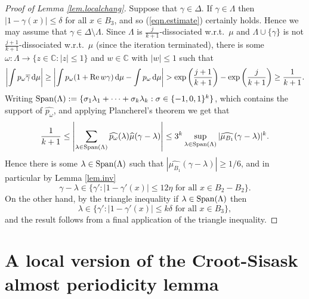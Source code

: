 \documentclass[12pt,reqno]{amsart}
\providecommand{\C}{\mathbb{C}}
\providecommand{\wh}{\widehat}
\newcommand{\dd}{\,\mathrm{d}}
\providecommand{\Span}{\mathop{\rm Span}\nolimits}
\renewcommand{\Re}{\mathop{\rm Re}\nolimits}
\numberwithin{equation}{section}
\begin{document}
\begin{proof}[Proof of Lemma \ref{lem.localchang}]
Suppose that $\gamma \in \Delta$.  If $\gamma \in \Lambda$ then $|1-\gamma(x)| \leq \delta$ for all $x \in B_3$, and so (\ref{eqn.estimate}) certainly holds. Hence we may assume that $\gamma \in \Delta \setminus \Lambda$.  Since $\Lambda$ is $\frac{j}{k+1}$-dissociated w.r.t.\ $\mu$ and $\Lambda \cup \{\gamma\}$ is not $\frac{j+1}{k+1}$-dissociated w.r.t.\ $\mu$ (since the iteration terminated), there is some $\omega:\Lambda \rightarrow \{z \in \C: |z|\leq 1\}$ and $w \in \C$ with $|w| \leq 1$ such that
\begin{equation*}
\left|\int{p_\omega \overline{\gamma} \dd\mu}\right| \geq \left|\int{p_{\omega}(1+\Re w \gamma ) \dd\mu}-\int{p_\omega \dd\mu}\right|  >  \exp\left(\frac{j+1}{k+1}\right)- \exp\left(\frac{j}{k+1}\right) \geq \frac{1}{k+1}.
\end{equation*}
Writing $\Span(\Lambda):=\{\sigma_1\lambda_1+\cdots +\sigma_k\lambda_k:\sigma \in \{-1,0,1\}^k\}$, which contains the support of $\wh{p_\omega}$, and applying Plancherel's theorem we get that
\begin{equation*}
 \frac{1}{k+1} \leq \left|\sum_{\lambda \in \Span(\Lambda)}{\wh{p_{\omega}}(\lambda)\wh{\mu}(\gamma-\lambda)}\right|\leq 3^k\sup_{\lambda \in \Span(\Lambda)}{|\wh{\mu_{B_1}}(\gamma-\lambda)|^k}.
\end{equation*}
Hence there is some $\lambda \in \Span(\Lambda)$ such that $|\wh{\mu_{B_1}}(\gamma-\lambda)| \geq 1/6$, and in particular by Lemma \ref{lem.inv}
\begin{equation*}
\gamma-\lambda \in \{\gamma': |1-\gamma'(x)| \leq 12\eta \textrm{ for all }x \in B_2-B_2\}.
\end{equation*}
On the other hand, by the triangle inequality if $\lambda \in \Span(\Lambda)$ then
\begin{equation*}
\lambda \in \{\gamma': |1-\gamma'(x)| \leq k \delta \textrm{ for all }x \in B_3\},
\end{equation*}
and the result follows from a final application of the triangle inequality.
\end{proof}

\section{A local version of the Croot-Sisask almost periodicity lemma}
\end{document}
